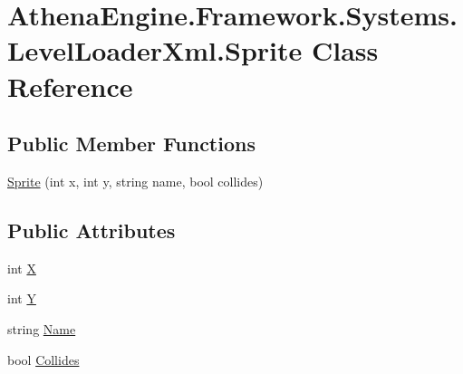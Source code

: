 \hypertarget{class_athena_engine_1_1_framework_1_1_systems_1_1_level_loader_xml_1_1_sprite}{\section{Athena\-Engine.\-Framework.\-Systems.\-Level\-Loader\-Xml.\-Sprite Class Reference}
\label{class_athena_engine_1_1_framework_1_1_systems_1_1_level_loader_xml_1_1_sprite}
}
\subsection*{Public Member Functions}
\begin{DoxyCompactItemize}
\item 
\hyperlink{class_athena_engine_1_1_framework_1_1_systems_1_1_level_loader_xml_1_1_sprite_a8f36af466221283907a22c3a62209583}{Sprite} (int x, int y, string name, bool collides)
\end{DoxyCompactItemize}
\subsection*{Public Attributes}
\begin{DoxyCompactItemize}
\item 
int \hyperlink{class_athena_engine_1_1_framework_1_1_systems_1_1_level_loader_xml_1_1_sprite_a4c92f207e040a387f9fbe71d3ba47401}{X}
\item 
int \hyperlink{class_athena_engine_1_1_framework_1_1_systems_1_1_level_loader_xml_1_1_sprite_ad28706ca852f07c843dc69f813e131e8}{Y}
\item 
string \hyperlink{class_athena_engine_1_1_framework_1_1_systems_1_1_level_loader_xml_1_1_sprite_a4453c50867d2bbb7def1f9503d314569}{Name}
\item 
bool \hyperlink{class_athena_engine_1_1_framework_1_1_systems_1_1_level_loader_xml_1_1_sprite_a7da4f84bef7fb76af3afc122394e39d2}{Collides}
\end{DoxyCompactItemize}


